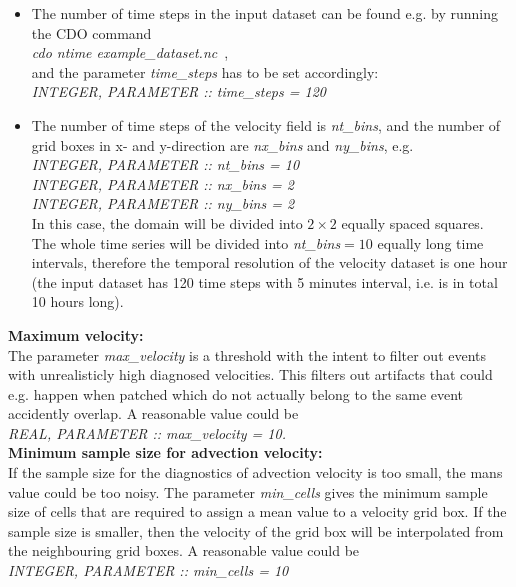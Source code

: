 \documentclass[11pt]{article}
\begin{document}
\begin{itemize}
\item The number of time steps in the input dataset can be found e.g. by running the CDO command\\
{\it cdo ntime example\_dataset.nc}\, ,\\
and the parameter {\it time\_steps} has to be set accordingly:\\
{\it INTEGER, PARAMETER    :: time\_steps = 120}
\item The number of time steps of the velocity field is {\it nt\_bins}, and the number of grid boxes in x- and y-direction are {\it nx\_bins} and {\it ny\_bins}, e.g.\\
{\it INTEGER, PARAMETER    ::  nt\_bins = 10}\\
{\it INTEGER, PARAMETER    ::  nx\_bins = 2}\\
{\it INTEGER, PARAMETER    ::  ny\_bins = 2}\\
In this case, the domain will be divided into $2\times 2$ equally spaced squares. The whole time series will be divided into {\it nt\_bins}$=10$ equally long time intervals, therefore the temporal resolution of the velocity dataset is one hour (the input dataset has 120 time steps with 5 minutes interval, i.e. is in total 10 hours long).
\end{itemize}\vspace{0.5cm}
{\bf Maximum velocity:}\\
The parameter {\it max\_velocity} is a threshold with the intent to filter out events with unrealisticly high diagnosed velocities. This filters out artifacts that could e.g. happen when patched which do not actually belong to the same event accidently overlap. A reasonable value could be\\
{\it REAL, PARAMETER       :: max\_velocity = 10.}\vspace{0.5cm} \\
{\bf Minimum sample size for advection velocity:}\\
If the sample size for the diagnostics of advection velocity is too small, the mans value could be too noisy. The parameter {\it min\_cells} gives the minimum sample size of cells that are required to assign a mean value to a velocity grid box. If the sample size is smaller, then the velocity of the grid box will be interpolated from the neighbouring grid boxes. A reasonable value could be\\
{\it INTEGER, PARAMETER    :: min\_cells = 10}\vspace{0.5cm} \\
\end{document}
